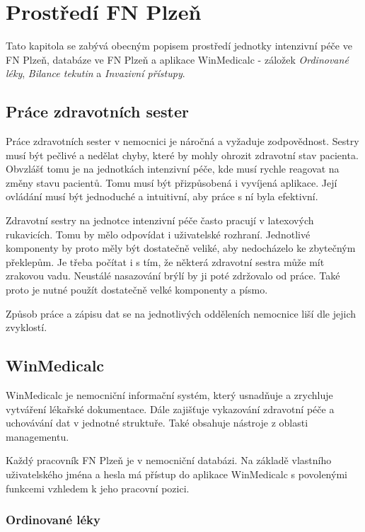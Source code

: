 \chapter{Prostředí FN Plzeň}
\label{ch:fn}

Tato kapitola se zabývá obecným popisem prostředí jednotky intenzivní péče ve FN Plzeň, databáze ve FN Plzeň a aplikace WinMedicalc - záložek \emph{Ordinované léky}, \emph{Bilance tekutin} a \emph{Invazivní přístupy}.

\section{Práce zdravotních sester}

Práce zdravotních sester v nemocnici je náročná a vyžaduje zodpovědnost. Sestry musí být pečlivé a nedělat chyby, které by mohly ohrozit zdravotní stav pacienta. Obvzlášť tomu je na jednotkách intenzivní péče, kde musí rychle reagovat na změny stavu pacientů. Tomu musí být přizpůsobená i vyvíjená aplikace. Její ovládání musí být jednoduché a intuitivní, aby práce s ní byla efektivní.

Zdravotní sestry na jednotce intenzivní péče často pracují v latexových rukavicích. Tomu by mělo odpovídat i uživatelské rozhraní. Jednotlivé komponenty by proto měly být dostatečně veliké, aby nedocházelo ke zbytečným překlepům. Je třeba počítat i s tím, že některá zdravotní sestra může mít zrakovou vadu. Neustálé nasazování brýlí by ji poté zdržovalo od práce. Také proto je nutné použít dostatečně velké komponenty a písmo.

Způsob práce a zápisu dat se na jednotlivých odděleních nemocnice liší dle jejich zvyklostí.

\section{WinMedicalc}

WinMedicalc je nemocniční informační systém, který usnadňuje a zrychluje vytváření lékařské dokumentace. Dále zajišťuje vykazování zdravotní péče a uchovávání dat v jednotné struktuře. Také obsahuje nástroje z oblasti managementu.

Každý pracovník FN Plzeň je v nemocniční databázi. Na základě vlastního uživatelského jména a hesla má přístup do aplikace WinMedicalc s povolenými funkcemi vzhledem k jeho pracovní pozici.

\subsection{Ordinované léky}

